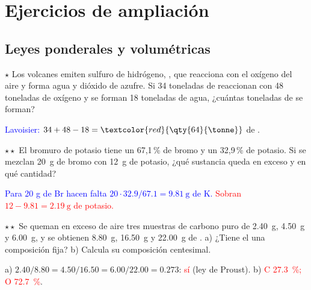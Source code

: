 \section{Ejercicios de ampliación}\label{sec:ud1-ampliacion}

\subsection{Leyes ponderales y volumétricas}

\begin{exercise}
    \(\star\) Los volcanes emiten sulfuro de hidrógeno, , que reacciona con el oxígeno del aire y forma agua y dióxido de
    azufre. Si 34 toneladas de  reaccionan con 48 toneladas de oxígeno y se forman 18 toneladas de agua, ¿cuántas
    toneladas de  se forman?
    \begin{solu}
        \textcolor{blue}{Lavoisier:} \(34 + 48 - 18 = \textcolor{red}{\qty{64}{\tonne}}\) de .
    \end{solu}
\end{exercise}

\begin{exercise}
    \(\star\star\) El bromuro de potasio tiene un 67,1\,\% de bromo y un 32,9\,\% de potasio. Si se mezclan \qty{20}{\gram} de bromo con
    \qty{12}{\gram} de potasio, ¿qué sustancia queda en exceso y en qué cantidad?
    \begin{solu}
        \textcolor{blue}{Para 20 g de Br hacen falta \(20 \cdot \num{32.9}/\num{67.1} = \qty{9.81}{\gram}\) de K.} \textcolor{red}{Sobran
        \(12 - \num{9.81} = \qty{2.19}{\gram}\) de potasio.}
    \end{solu}
\end{exercise}

\begin{exercise}
    \(\star\star\) Se queman en exceso de aire tres muestras de carbono puro de \qty{2.40}{\gram}, \qty{4.50}{\gram} y \qty{6.00}{\gram}, y se
    obtienen \qty{8.80}{\gram}, \qty{16.50}{\gram} y \qty{22.00}{\gram} de . a) ¿Tiene el  una composición fija? b) Calcula su
    composición centesimal.
    \begin{solu}
        a) \(\num{2.40}/\num{8.80} = \num{4.50}/\num{16.50} = \num{6.00}/\num{22.00} = \num{0.273}\): \textcolor{red}{sí} (ley de Proust).
        b) \textcolor{red}{C \qty{27.3}{\percent}; O \qty{72.7}{\percent}}.
    \end{solu}
\end{exercise}

